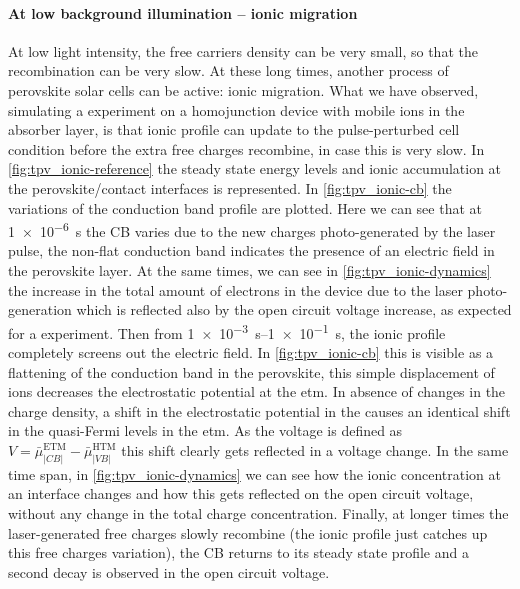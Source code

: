 		\paragraph{At low background illumination -- ionic migration}\label{tpv_biexp_lowlight_ions}
		At low light intensity, the free carriers density can be very small, so that the recombination can be very slow.
		At these long times, another process of perovskite solar cells can be active: ionic migration.
		What we have observed, simulating a  experiment on a homojunction device with mobile ions in the absorber layer, is that ionic profile can update to the pulse\hyp{}perturbed cell condition before the extra free charges recombine, in case this is very slow.
		In \cref{fig:tpv_ionic-reference} the steady state energy levels and ionic accumulation at the perovskite/contact interfaces is represented.
		In \cref{fig:tpv_ionic-cb} the variations of the conduction band profile are plotted.
		Here we can see that at \SI{1e-6}{s} the CB varies due to the new charges photo\hyp{}generated by the laser pulse, the non-flat conduction band indicates the presence of an electric field in the perovskite layer.
		At the same times, we can see in \cref{fig:tpv_ionic-dynamics} the increase in the total amount of electrons in the device due to the laser photo-generation which is reflected also by the open circuit voltage increase, as expected for a  experiment.
		Then from \SIrange{1e-3}{1e-1}{s}, the ionic profile completely screens out the electric field.
		In \cref{fig:tpv_ionic-cb} this is visible as a flattening of the conduction band in the perovskite, this simple displacement of ions decreases the electrostatic potential at the \gls{etm}.
		In absence of changes in the charge density, a shift in the electrostatic potential in the  causes an identical shift in the quasi-Fermi levels in the \gls{etm}.
		As the voltage is defined as $V = \bar\mu_|CB|^{\mathrm{ETM}} - \bar\mu_|VB|^{\mathrm{HTM}}$ this shift clearly gets reflected in a voltage change.
		In the same time span, in \cref{fig:tpv_ionic-dynamics} we can see how the ionic concentration at an interface changes and how this gets reflected on the open circuit voltage, without any change in the total charge concentration.
		Finally, at longer times the laser\hyp{}generated free charges slowly recombine (the ionic profile just catches up this free charges variation), the CB returns to its steady state profile and a second decay is observed in the open circuit voltage.
